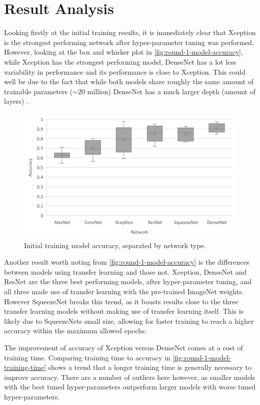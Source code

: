 \section{Result Analysis}
Looking firstly at the initial training results, it is immediately clear that Xception is the strongest performing network after hyper-parameter tuning was performed. However, looking at the box and whisker plot in \autoref{fig:round-1-model-accuracy}, while Xception has the strongest performing model, DenseNet has a lot less variability in performance and its performance is close to Xception. This could well be due to the fact that while both models share roughly the same amount of trainable parameters ($\sim$20 million) DenseNet has a much larger depth (amount of layers) \citep{KerasApp92:online}.

\begin{figure}[H]
    \centering
    \includegraphics[width=\textwidth]{figures/round-1-model-accuracy.png}
    \caption{Initial training model accuracy, separated by network type.}
    \label{fig:round-1-model-accuracy}
\end{figure}

Another result worth noting from \autoref{fig:round-1-model-accuracy} is the differences between models using transfer learning and those not. Xception, DenseNet and ResNet are the three best performing models, after hyper-parameter tuning, and all three made use of transfer learning with the pre-trained ImageNet weights. However SqueezeNet breaks this trend, as it boasts results close to the three transfer learning models without making use of transfer learning itself. This is likely due to SqueezeNets small size, allowing for faster training to reach a higher accuracy within the maximum allowed epochs.

The improvement of accuracy of Xception versus DenseNet comes at a cost of training time. Comparing training time to accuracy in \autoref{fig:round-1-model-training-time} shows a trend that a longer training time is generally necessary to improve accuracy. There are a number of outliers here however, as smaller models with the best tuned hyper-parameters outperform larger models with worse tuned hyper-parameters.

